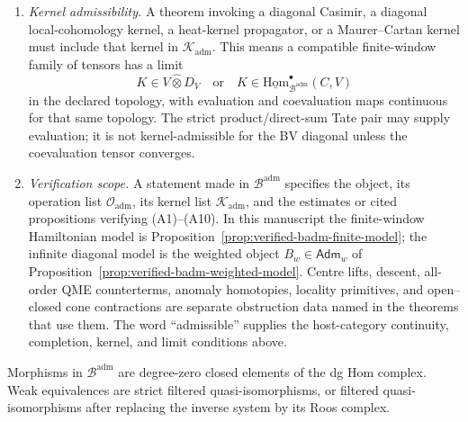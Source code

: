 \begin{defn}
\begin{enumerate}[label=\textup{(A\arabic*)}]
      estimate in the chosen filtration.  For the Matlis cotangent
      action this means either the locally finite direct-sum statement of
      Lemma~\ref{lem:app-matlis-coadjoint-continuity}, where a fixed
      principal part sees only a finite jet of a formal Hamiltonian, or
      the pro-Matlis seminorm estimate of
      Proposition~\ref{prop:completion-promatlis-continuity}.  A finite
      Matlis cutoff is not a strict \(\mathfrak h\)-submodule unless the
      window-loss term is recorded.
    \item \emph{Kernel admissibility.}  A theorem invoking a diagonal
      Casimir, a diagonal local-cohomology kernel, a heat-kernel
      propagator, or a Maurer--Cartan kernel must include that kernel in
      \(\mathcal K_{\mathrm{adm}}\).  This means a compatible finite-window
      family of tensors has a limit
      \[
        K\in V\widehat\otimes D_V
        \quad\text{or}\quad
        K\in
        \underline{\mathrm{Hom}}_{\mathcal B^{\mathrm{adm}}}^{\bullet}
        (C,V)
      \]
      in the declared topology, with evaluation and coevaluation maps
      continuous for that same topology.  The strict product/direct-sum
      Tate pair may supply evaluation; it is not kernel-admissible for
      the BV diagonal unless the coevaluation tensor converges.
    \item \emph{Verification scope.}  A statement made in
      \(\mathcal B^{\mathrm{adm}}\) specifies the object, its operation
      list \(\mathcal O_{\mathrm{adm}}\), its kernel list
      \(\mathcal K_{\mathrm{adm}}\), and the estimates or cited
      propositions verifying (A1)--(A10).  In this manuscript the
      finite-window Hamiltonian model is
      Proposition~\ref{prop:verified-badm-finite-model}; the infinite
      diagonal model is the weighted object
      \(B_w\in\mathsf{Adm}_w\) of
      Proposition~\ref{prop:verified-badm-weighted-model}.  Centre lifts,
      descent, all-order QME counterterms, anomaly homotopies, locality
      primitives, and open--closed cone contractions are separate
      obstruction data named in the theorems that use them.  The word
      ``admissible'' supplies the host-category continuity,
      completion, kernel, and limit conditions above.
  \end{enumerate}
  Morphisms in \(\mathcal B^{\mathrm{adm}}\) are degree-zero closed
  elements of the dg Hom complex.  Weak equivalences are strict
  filtered quasi-isomorphisms, or filtered quasi-isomorphisms after
  replacing the inverse system by its Roos complex.
\end{defn}

